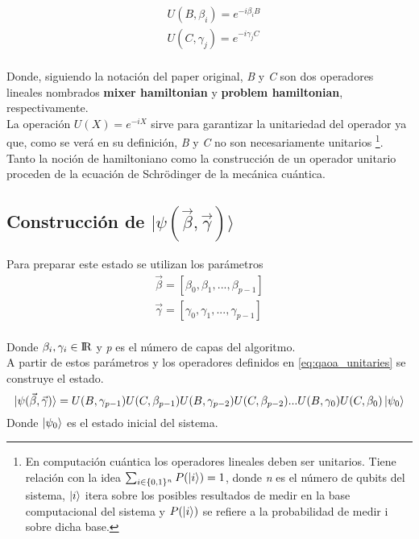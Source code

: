 \documentclass{article}
\begin{document}
\begin{equation}
  \label{eq:qaoa_unitaries}
  \begin{aligned}
    & U(B, \beta_i) = e^{-i \beta_i B} \\
    & U(C, \gamma_j) = e^{-i \gamma_j C} \\
  \end{aligned}
\end{equation}

Donde, siguiendo la notación del paper original, \textit{B} y \textit{C} son dos operadores lineales nombrados \textbf{mixer hamiltonian} y \textbf{problem hamiltonian}, respectivamente.
\\ La operación \(U(X) = e^{-i X}\) sirve para garantizar la unitariedad del operador ya que, como se verá en su definición, \textit{B} y \textit{C} no son necesariamente unitarios
\footnote{En computación cuántica los operadores lineales deben ser unitarios. Tiene relación con la idea
  \(\sum_{i \in \{0, 1\}^{n} } {P(\ket{i})} = 1\),
  donde \textit{n} es el número de qubits del sistema,
  \(\ket{i}\) itera sobre los posibles resultados de medir en la base computacional del sistema y
  \(P(\ket{i})\) se refiere a la probabilidad de medir i sobre dicha base.}.
\\ Tanto la noción de hamiltoniano como la construcción de un operador unitario proceden de la ecuación de Schrödinger de la mecánica cuántica.

\subsection{Construcción de \(\lvert\psi(\vec{\beta}, \vec{\gamma})\rangle\)}
Para preparar este estado se utilizan los parámetros
\begin{align*}
  \vec{\beta} = [\beta_0, \beta_1, ..., \beta_{p-1}] \\
  \vec{\gamma} = [\gamma_0, \gamma_1, ..., \gamma_{p-1}] \\
\end{align*}

Donde \( \beta_i, \gamma_i \in \rm{I\!R} \) y \textit{p} es el número de capas del algoritmo.
\\ A partir de estos parámetros y los operadores definidos en \ref{eq:qaoa_unitaries} se construye el estado.
\[
  \lvert\psi(\vec{\beta}, \vec{\gamma})\rangle = U(B, \gamma_{p-1})U(C, \beta_{p-1})U(B, \gamma_{p-2})U(C, \beta_{p-2}) ... U(B, \gamma_0)U(C, \beta_0) \ket{\psi_0}
\]
Donde \(\ket{\psi_0}\) es el estado inicial del sistema.
\end{document}
